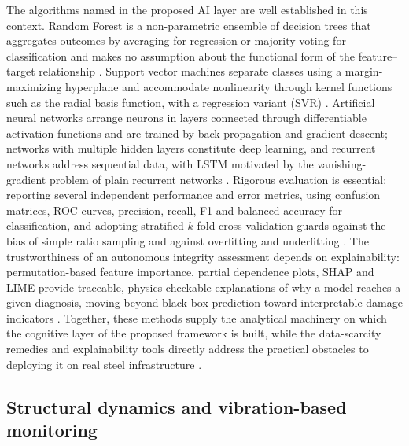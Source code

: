 The algorithms named in the proposed AI layer are well established in this context. Random Forest is a non-parametric ensemble of decision trees that aggregates outcomes by averaging for regression or majority voting for classification and makes no assumption about the functional form of the feature--target relationship \citep{naser2023ml}. Support vector machines separate classes using a margin-maximizing hyperplane and accommodate nonlinearity through kernel functions such as the radial basis function, with a regression variant (SVR) \citep{naser2023ml}. Artificial neural networks arrange neurons in layers connected through differentiable activation functions and are trained by back-propagation and gradient descent; networks with multiple hidden layers constitute deep learning, and recurrent networks address sequential data, with LSTM motivated by the vanishing-gradient problem of plain recurrent networks \citep{naser2023ml}. Rigorous evaluation is essential: reporting several independent performance and error metrics, using confusion matrices, ROC curves, precision, recall, F1 and balanced accuracy for classification, and adopting stratified $k$-fold cross-validation guards against the bias of simple ratio sampling and against overfitting and underfitting \citep{naser2023ml}. The trustworthiness of an autonomous integrity assessment depends on explainability: permutation-based feature importance, partial dependence plots, SHAP and LIME provide traceable, physics-checkable explanations of why a model reaches a given diagnosis, moving beyond black-box prediction toward interpretable damage indicators \citep{naser2023ml}. Together, these methods supply the analytical machinery on which the cognitive layer of the proposed framework is built, while the data-scarcity remedies and explainability tools directly address the practical obstacles to deploying it on real steel infrastructure \citep{avci2021review}.

\subsection{Structural dynamics and vibration-based monitoring}\label{subsec:dynamics}

